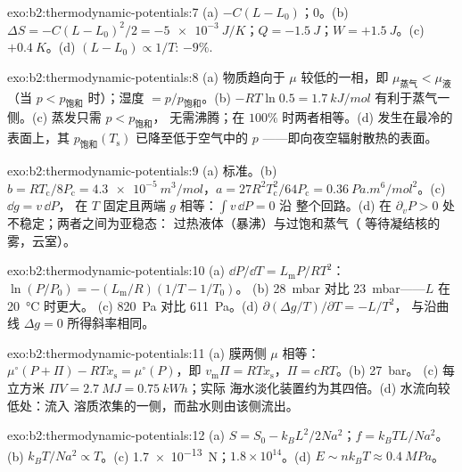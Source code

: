 \begin{solution}{exo:b2:thermodynamic-potentials:7}
(a) $-C(L - L_0)$；$0$。(b) $\Delta S = -C(L - L_0)^2/2 = \qty{-5e-3}{J/K}$；$Q =
\qty{-1.5}{J}$；$W = +\qty{1.5}{J}$。(c) $+\qty{0.4}{K}$。(d) $(L - L_0) \propto
1/T$: $-9\%$.
\end{solution}

\begin{solution}{exo:b2:thermodynamic-potentials:8}
(a) 物质趋向于 $\mu$ 较低的一相，即 $\mu_{\text{蒸气}} < \mu_{\text{液}}$（当 $p <
p_{\text{饱和}}$ 时）；湿度 $= p/p_{\text{饱和}}$。(b) $-RT\ln 0.5 = \qty{1.7}{kJ/mol}$
有利于蒸气一侧。(c) 蒸发只需 $p < p_{\text{饱和}}$，
无需沸腾；在 $100\%$ 时两者相等。(d) 发生在最冷的
表面上，其 $p_{\text{饱和}}(T_{\text{s}})$ 已降至低于空气中的 $p$
——即向夜空辐射散热的表面。
\end{solution}

\begin{solution}{exo:b2:thermodynamic-potentials:9}
(a) 标准。(b) $b = RT_{\text{c}}/8P_{\text{c}} = \qty{4.3e-5}{m^3/mol}$，$a =
27R^2T_{\text{c}}^2/64P_{\text{c}} = \qty{0.36}{Pa.m^6/mol^2}$。(c) $\dd g = v\,\dd P$，
在 $T$ 固定且两端 $g$ 相等：$\int v\,\dd P = 0$ 沿
整个回路。(d) 在 $\partial_vP > 0$ 处不稳定；两者之间为亚稳态：
过热液体（暴沸）与过饱和蒸气（
等待凝结核的雾，云室）。
\end{solution}

\begin{solution}{exo:b2:thermodynamic-potentials:10}
(a) $\dd P/\dd T = L_{\text{m}}P/RT^2$：$\ln(P/P_0) = -(L_{\text{m}}/R)(1/T - 1/T_0)$。
(b) \qty{28}{mbar} 对比 \qty{23}{mbar}——$L$ 在 \qty{20}{\celsius} 时更大。
(c) \qty{820}{Pa} 对比 \qty{611}{Pa}。(d) $\partial(\Delta g/T)/\partial T = -L/T^2$，
与沿曲线 $\Delta g = 0$ 所得斜率相同。
\end{solution}

\begin{solution}{exo:b2:thermodynamic-potentials:11}
(a) 膜两侧 $\mu$ 相等：$\mu^\circ(P + \Pi) - RTx_{\text{s}} =
\mu^\circ(P)$，即 $v_{\text{m}}\Pi = RTx_{\text{s}}$，$\Pi = cRT$。(b) \qty{27}{bar}。
(c) 每立方米 $\Pi V = \qty{2.7}{MJ} = \qty{0.75}{kWh}$；实际
海水淡化装置约为其四倍。(d) 水流向较低处：流入
溶质浓集的一侧，而盐水则由该侧流出。
\end{solution}

\begin{solution}{exo:b2:thermodynamic-potentials:12}
(a) $S = S_0 - k_BL^2/2Na^2$；$f = k_BTL/Na^2$。(b) $k_BT/Na^2 \propto T$。(c)
\qty{1.7e-13}{N}；$1.8 \times 10^{14}$。(d) $E \sim nk_BT \approx \qty{0.4}{MPa}$。
\end{solution}

